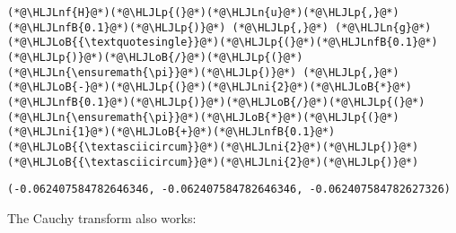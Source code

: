 \documentclass[12pt,a4paper]{article}
\newcommand{\HLJLn}[1]{#1}
\newcommand{\HLJLnf}[1]{\textcolor[RGB]{66,102,213}{#1}}
\newcommand{\HLJLnfB}[1]{\textcolor[RGB]{59,151,46}{#1}}
\newcommand{\HLJLni}[1]{\textcolor[RGB]{59,151,46}{#1}}
\newcommand{\HLJLoB}[1]{\textcolor[RGB]{102,102,102}{\textbf{#1}}}
\newcommand{\HLJLp}[1]{#1}
\begin{document}
\begin{lstlisting}
(*@\HLJLnf{H}@*)(*@\HLJLp{(}@*)(*@\HLJLn{u}@*)(*@\HLJLp{,}@*)(*@\HLJLnfB{0.1}@*)(*@\HLJLp{)}@*) (*@\HLJLp{,}@*) (*@\HLJLn{g}@*)(*@\HLJLoB{{\textquotesingle}}@*)(*@\HLJLp{(}@*)(*@\HLJLnfB{0.1}@*)(*@\HLJLp{)}@*)(*@\HLJLoB{/}@*)(*@\HLJLp{(}@*)(*@\HLJLn{\ensuremath{\pi}}@*)(*@\HLJLp{)}@*) (*@\HLJLp{,}@*) (*@\HLJLoB{-}@*)(*@\HLJLp{(}@*)(*@\HLJLni{2}@*)(*@\HLJLoB{*}@*)(*@\HLJLnfB{0.1}@*)(*@\HLJLp{)}@*)(*@\HLJLoB{/}@*)(*@\HLJLp{(}@*)(*@\HLJLn{\ensuremath{\pi}}@*)(*@\HLJLoB{*}@*)(*@\HLJLp{(}@*)(*@\HLJLni{1}@*)(*@\HLJLoB{+}@*)(*@\HLJLnfB{0.1}@*)(*@\HLJLoB{{\textasciicircum}}@*)(*@\HLJLni{2}@*)(*@\HLJLp{)}@*)(*@\HLJLoB{{\textasciicircum}}@*)(*@\HLJLni{2}@*)(*@\HLJLp{)}@*)
\end{lstlisting}

\begin{lstlisting}
(-0.062407584782646346, -0.062407584782646346, -0.062407584782627326)
\end{lstlisting}


The Cauchy transform also works:
\end{document}
